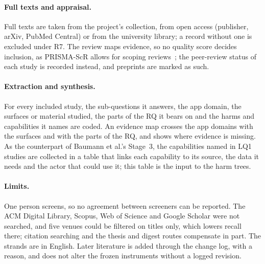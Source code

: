 \paragraph{Full texts and appraisal.} Full texts are taken from the project's
collection, from open access (publisher, arXiv, PubMed Central) or from the
university library; a record without one is excluded under R7. The review maps
evidence, so no quality score decides inclusion, as PRISMA-ScR allows for
scoping reviews~\parencite{tricco2018prisma}; the peer-review status of each
study is recorded instead, and preprints are marked as such.

\paragraph{Extraction and synthesis.} For every included study, the
sub-questions it answers, the app domain, the surfaces or material studied,
the parts of the RQ it bears on and the harms and capabilities it names are
coded. An evidence map crosses the app domains with the surfaces and with the
parts of the RQ, and shows where evidence is missing. As the counterpart of
Baumann et al.'s Stage~3, the capabilities named in LQ1 studies are collected
in a table that links each capability to its source, the data it needs and the
actor that could use it; this table is the input to the harm trees.

\paragraph{Limits.} One person screens, so no agreement between screeners can
be reported. The ACM Digital Library, Scopus, Web of Science and Google Scholar
were not searched, and five venues could be filtered on titles only, which
lowers recall there; citation searching and the thesis and digest routes
compensate in part. The strands are in English. Later literature is added
through the change log, with a reason, and does not alter the frozen
instruments without a logged revision.

